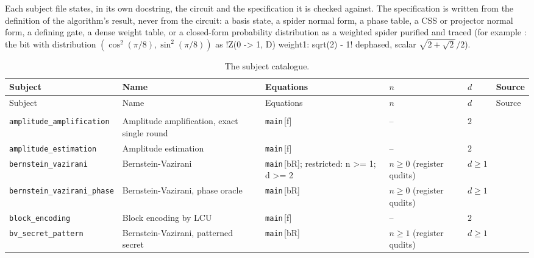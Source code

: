 Each subject file states, in its own docstring, the circuit and the specification it is checked
against. The specification is written from the definition of the algorithm's result, never from
the circuit: a basis state, a spider normal form, a phase table, a CSS or projector normal form,
a defining gate, a dense weight table, or a closed-form probability distribution as a weighted
spider purified and traced (for example : the bit with distribution
$(\cos^2(\pi/8), \sin^2(\pi/8))$ as \azx!Z(0 -> 1, D) weight{1: sqrt(2) - 1}! dephased, scalar
$\sqrt{2+\sqrt2}/2$).

{\small
\begin{xltabular}{\textwidth}{@{}>{\raggedright\arraybackslash}p{0.2\textwidth}
  >{\raggedright\arraybackslash}X
  >{\raggedright\arraybackslash}p{0.16\textwidth}
  >{\raggedright\arraybackslash}p{0.15\textwidth}
  >{\raggedright\arraybackslash}p{0.08\textwidth}
  >{\raggedright\arraybackslash}p{0.07\textwidth}@{}}
\caption{The subject catalogue.}\label{tab:bench-catalogue}\\
\toprule
Subject & Name & Equations & $n$ & $d$ & Source\\
\midrule\endfirsthead
\toprule
Subject & Name & Equations & $n$ & $d$ & Source\\
\midrule\endhead
\bottomrule\endfoot
{}\\
\midrule
\texttt{amplitude\_\allowbreak{}amplification} & Amplitude amplification, exact single round & \texttt{main}\,[f] & -- & $2$ & \cite{brassard2002quantum}\\
\texttt{amplitude\_\allowbreak{}estimation} & Amplitude estimation & \texttt{main}\,[f] & -- & $2$ & \cite{brassard2002quantum}\\
\texttt{bernstein\_\allowbreak{}vazirani} & Bernstein-Vazirani & \texttt{main}\,[bR]; restricted: n >= 1; d >= 2 & $n\ge 0$ (register qudits) & $d\ge 1$ & \cite{bernstein1997complexity}\\
\texttt{bernstein\_\allowbreak{}vazirani\_\allowbreak{}phase} & Bernstein-Vazirani, phase oracle & \texttt{main}\,[bR] & $n\ge 0$ (register qudits) & $d\ge 1$ & \cite{bernstein1997complexity}\\
\texttt{block\_\allowbreak{}encoding} & Block encoding by LCU & \texttt{main}\,[f] & -- & $2$ & \cite{gilyen2019quantum}\\
\texttt{bv\_\allowbreak{}secret\_\allowbreak{}pattern} & Bernstein-Vazirani, patterned secret & \texttt{main}\,[bR] & $n\ge 1$ (register qudits) & $d\ge 1$ & \cite{bernstein1997complexity}\\

\end{xltabular}}
